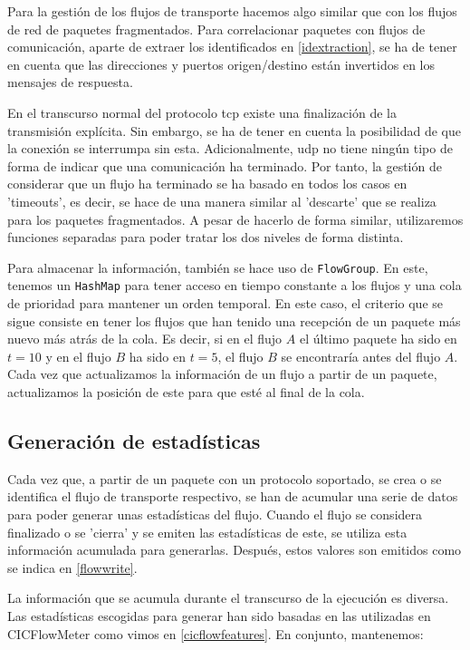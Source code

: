 Para la gestión de los flujos de transporte hacemos algo similar que con los flujos de red de paquetes fragmentados. Para correlacionar paquetes con flujos de comunicación, aparte de extraer los identificados en \ref{idextraction}, se ha de tener en cuenta que las direcciones y puertos origen/destino están invertidos en los mensajes de respuesta.

En el transcurso normal del protocolo \acrshort{tcp} existe una finalización de la transmisión explícita. Sin embargo, se ha de tener en cuenta la posibilidad de que la conexión se interrumpa sin esta. Adicionalmente, \acrshort{udp} no tiene ningún tipo de forma de indicar que una comunicación ha terminado. Por tanto, la gestión de considerar que un flujo ha terminado se ha basado en todos los casos en 'timeouts', es decir, se hace de una manera similar al 'descarte' que se realiza para los paquetes fragmentados. A pesar de hacerlo de forma similar, utilizaremos funciones separadas para poder tratar los dos niveles de forma distinta.

Para almacenar la información, también se hace uso de \texttt{FlowGroup}. En este, tenemos un \texttt{HashMap} para tener acceso en tiempo constante a los flujos y una cola de prioridad para mantener un orden temporal. En este caso, el criterio que se sigue consiste en tener los flujos que han tenido una recepción de un paquete más nuevo más atrás de la cola. Es decir, si en el flujo $A$ el último paquete ha sido en $t=10$ y en el flujo $B$ ha sido en $t=5$, el flujo $B$ se encontraría antes del flujo $A$. Cada vez que actualizamos la información de un flujo a partir de un paquete, actualizamos la posición de este para que esté al final de la cola.

\subsection{Generación de estadísticas} \label{statsgen}

Cada vez que, a partir de un paquete con un protocolo soportado, se crea o se identifica el flujo de transporte respectivo, se han de acumular una serie de datos para poder generar unas estadísticas del flujo. Cuando el flujo se considera finalizado o se 'cierra' y se emiten las estadísticas de este, se utiliza esta información acumulada para generarlas. Después, estos valores son emitidos como se indica en \ref{flowwrite}.

La información que se acumula durante el transcurso de la ejecución es diversa. Las estadísticas escogidas para generar han sido basadas en las utilizadas en CICFlowMeter como vimos en \ref{cicflowfeatures}. En conjunto, mantenemos:

